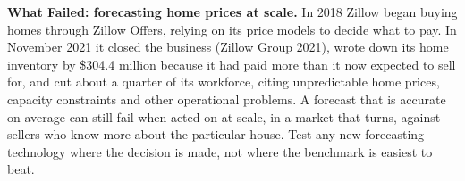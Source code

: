 \begin{callout}
\textbf{What Failed: forecasting home prices at scale.} In 2018 Zillow began buying homes through Zillow Offers, relying on its price models to decide what to pay. In November 2021 it closed the business (Zillow Group 2021), wrote down its home inventory by \$304.4 million because it had paid more than it now expected to sell for, and cut about a quarter of its workforce, citing unpredictable home prices, capacity constraints and other operational problems. A forecast that is accurate on average can still fail when acted on at scale, in a market that turns, against sellers who know more about the particular house. Test any new forecasting technology where the decision is made, not where the benchmark is easiest to beat.
\end{callout}
